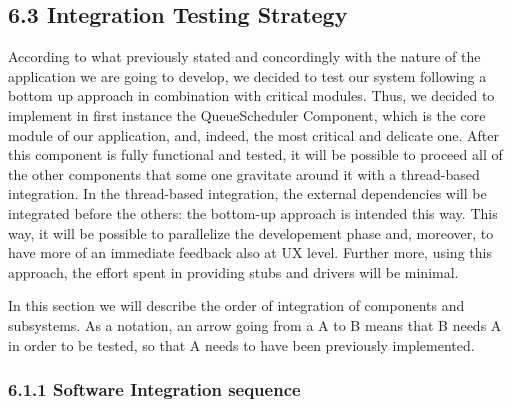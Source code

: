  \subsection{6.3 Integration Testing Strategy}
\label{subsect:integrationtestingstrategy}
According to what previously stated and concordingly with the nature of the application we are going to develop, we decided to test our system following a bottom up approach in combination with critical modules.
Thus, we decided to implement in first instance the QueueScheduler Component, which is the core module of our application, and, indeed, the most critical and delicate one. After this component is fully functional and tested, it will be possible to proceed all of the other components that some one gravitate around it with a thread-based integration. In the thread-based integration, the external dependencies will be integrated before the others: the bottom-up approach is intended this way.
This way, it will be possible to parallelize the developement phase and, moreover, to have more of an immediate feedback also at UX level. Further more, using this approach, the effort spent in providing stubs and drivers will be minimal.

In this section we will describe the order of integration of components and subsystems.
As a notation, an arrow going from a A to B means that B needs A in order to be tested, so that A needs to have been previously implemented.

\subsubsection{6.1.1 Software Integration sequence}
\label{subsect: softwareintegrationsequence}


